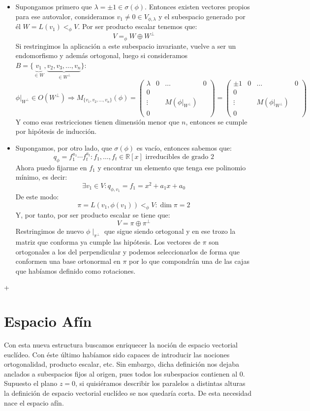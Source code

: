 \documentclass[10pt,a4paper,openright]{book}
\theoremstyle{break}
\begin{document}
\begin{itemize}
\item Supongamos primero que $\lambda = \pm 1 \in \sigma(\phi)$. Entonces existen vectores propios para ese autovalor, consideramos $v_1 \neq 0 \in V_{\phi, \lambda}$ y el subespacio generado por él $W = L(v_1) <_\phi V$. Por ser producto escalar tenemos que:
$$V =_\phi W \oplus W^\perp$$
Si restringimos la aplicación a este subespacio invariante, vuelve a ser un endomorfismo y además ortogonal, luego si consideramos $B=\{\underbrace{v_1}_{\in W}, \underbrace{v_2, v_3, \ldots, v_n}_{\in W^\perp}\}$:
$$\phi|_{W^\perp}\in O(W^\perp)\Rightarrow M_{\{v_1,v_2,\ldots , v_n\}} (\phi) =
\left(
\begin{array}{c|ccc}
\lambda & 0 & \ldots & 0 \\
\hline
0  & & &  \\
\vdots & & M(\phi|_{W^\perp}) & \\
0 & & &
\end{array}
\right) = \left(
\begin{array}{c|ccc}
\pm 1 & 0 & \ldots & 0 \\
\hline
0  & & &  \\
\vdots & & M(\phi|_{W^\perp}) & \\
0 & & &
\end{array}
\right) $$
Y como esas restricciones tienen dimensión menor que $n$, entonces se cumple  por hipótesis de inducción.

\item Supongamos, por otro lado, que $\sigma (\phi)$ es vacío, entonces sabemos que:
$$q_\phi = f_1^{a_1} \cdots f_t^{a_t}: f_1, \ldots, f_t \in \mathbb{R}[x] \mbox{ irreducibles de grado } 2$$
Ahora puedo fijarme en $f_{1}$ y encontrar un elemento que tenga ese polinomio mínimo, es decir:
$$\exists v_1\in V: q_{\phi, v_1} = f_1 = x^2+a_1x+a_0$$
De este modo:
$$\pi = L(v_1, \phi(v_1))<_\phi V: \dim \pi = 2$$
Y, por tanto, por ser producto escalar se tiene que:
$$V = \pi \oplus \pi^\perp$$
Restringimos de nuevo $\phi\mid_{\pi^\perp}$ que sigue siendo ortogonal y en ese trozo la matriz que conforma ya cumple las hipótesis. Los vectores de $\pi$ son ortogonales a los del perpendicular y podemos seleccionarlos de forma que conformen una base ortonormal en $\pi$ por lo que compondrán una de las cajas que habíamos definido como rotaciones.
\end{itemize}

+\chapter{Espacio Afín}
Con esta nueva estructura buscamos enriquecer la noción de espacio vectorial euclídeo. Con éste último habíamos sido capaces de introducir las nociones ortogonalidad, producto escalar, etc. Sin embargo, dicha definición nos dejaba anclados a subespacios fijos al origen, pues todos los subespacios contienen al 0. Supuesto el plano $z=0$, si quisiéramos describir los paralelos a distintas alturas la definición de espacio vectorial euclídeo se nos quedaría corta. De esta necesidad nace el espacio afín.
\end{document}
